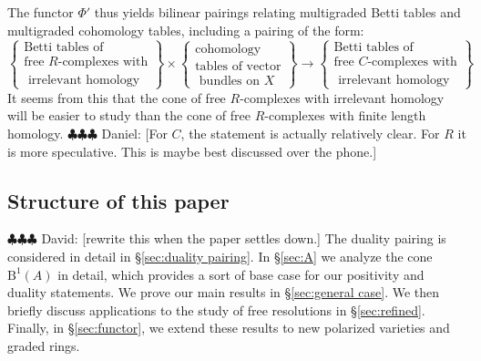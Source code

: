 \documentclass[12pt]{amsart}
\theoremstyle{definition}
\theoremstyle{remark}
\newcommand{\BBQ}{\mathrm{B}}
\newcommand{\daniel}[1]{{\color{green} \sf $\clubsuit\clubsuit\clubsuit$ Daniel: [#1]}}
\newcommand{\david}[1]{{\color{red} \sf $\clubsuit\clubsuit\clubsuit$ David: [#1]}}
\begin{document}
The functor $\Phi'$ thus yields bilinear pairings relating multigraded Betti tables and multigraded cohomology tables, including a pairing of the form:
\begin{equation*}%
\label{eqn:multipairing}
%
\left\{\begin{matrix}
\text{Betti tables of} \\ \text{free $R$-complexes with}\\
\text{  irrelevant homology}\end{matrix}\right\}
%
\times 
%
\left\{\begin{matrix}
\text{cohomology }\\
\text{tables of vector}\\
\text{ bundles on } X
\end{matrix}\right\}
%
\longrightarrow
\left\{\begin{matrix}
\text{Betti tables of} \\ \text{free $C$-complexes with}\\
\text{  irrelevant homology}
\end{matrix}\right\}
\end{equation*}
It seems from this that the cone of free $R$-complexes with irrelevant homology will be easier to study than the cone of free $R$-complexes with finite length homology.  \daniel{For $C$, the statement is actually relatively clear.  For $R$ it is more speculative.  This is maybe best discussed over the phone.}

\subsection*{Structure of this paper}
\david{rewrite this when the paper settles down.} 
 The duality pairing is considered in detail in \S\ref{sec:duality pairing}. In \S\ref{sec:A} we analyze the cone $\BBQ^1(A)$ in detail, which provides a sort of base case for our positivity and duality statements.  We prove our main results in \S\ref{sec:general case}.  We then briefly discuss applications to the study of free resolutions in \S\ref{sec:refined}.  Finally, in \S\ref{sec:functor}, we extend these results to new polarized varieties and graded rings.

\end{document}
